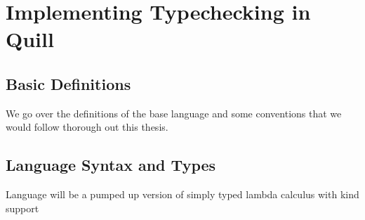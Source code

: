 \chapter{Implementing Typechecking in Quill}


\section{Basic Definitions}

We go over the definitions of the base language and some conventions that we would
follow thorough out this thesis.

\section{Language Syntax and Types}

Language will be a pumped up version of simply typed lambda calculus with kind support

